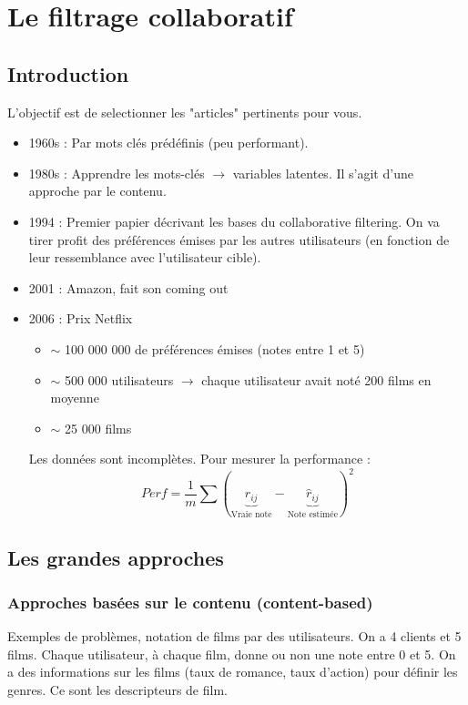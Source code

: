\documentclass{article}
\begin{document}
\section{Le filtrage collaboratif}

\subsection{Introduction}
L'objectif est de selectionner les "articles" pertinents pour vous.
\begin{itemize}
\item 1960s : Par mots clés prédéfinis (peu performant).
\item 1980s : Apprendre les mots-clés $\rightarrow$ variables latentes. Il s'agit d'une approche par le contenu.
\item 1994 : Premier papier décrivant les bases du collaborative filtering. On va tirer profit des préférences émises par les autres utilisateurs (en fonction de leur ressemblance avec l'utilisateur cible).
\item 2001 : Amazon, fait son coming out
\item 2006 : Prix Netflix
    \begin{itemize}
    \item $\sim$ 100 000 000 de préférences émises (notes entre 1 et 5)
    \item $\sim$ 500 000 utilisateurs $\rightarrow$ chaque utilisateur avait noté 200 films en moyenne
    \item $\sim$ 25 000 films
    \end{itemize}
    Les données sont incomplètes. Pour mesurer la performance : 
    $$ Perf = \frac{1}{m} \sum (\underbrace{r_{ij}}_{\text{Vraie note}} - \underbrace{\hat{r}_{ij}}_{\text{Note estimée}})^2 $$
\end{itemize}

\subsection{Les grandes approches}

\subsubsection{Approches basées sur le contenu (content-based)}

Exemples de problèmes, notation de films par des utilisateurs. On a 4 clients et 5 films. Chaque utilisateur, à chaque film, donne ou non une note entre 0 et 5. On a des informations sur les films (taux de romance, taux d'action) pour définir les genres. Ce sont les descripteurs de film.
\end{document}
